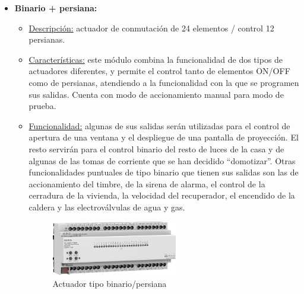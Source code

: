 \begin{itemize}
\item \textbf{Binario + persiana:} 
	\begin{itemize}
	\item\underline{Descripción:} actuador de conmutación de 24 elementos / control 12 persianas.
	\item \underline{Características:} este módulo combina la funcionalidad de dos tipos de actuadores diferentes, y permite el control tanto de elementos ON/OFF como de persianas, atendiendo a la funcionalidad con la que se programen sus salidas. Cuenta con modo de accionamiento manual para modo de prueba.
	\item \underline{Funcionalidad:} algunas de sus salidas serán utilizadas para el control de apertura de una ventana y el despliegue de una pantalla de proyección. El resto servirán para el control binario del resto de luces de la casa y de algunas de las tomas de corriente que se han decidido “domotizar”. Otras funcionalidades puntuales de tipo binario que tienen sus salidas son las de accionamiento del timbre, de la sirena de alarma, el control de la cerradura de la vivienda, la velocidad del recuperador, el encendido de la caldera y las electroválvulas de agua y gas.
	\begin{figure}[H]
	\centering
	\includegraphics[width=0.55\textwidth]{figures/actuador_binario.png}   
	\caption{Actuador tipo binario/persiana}
	\label{fig:actuador_binario}
	\end{figure}
	\end{itemize} 


\end{itemize}
